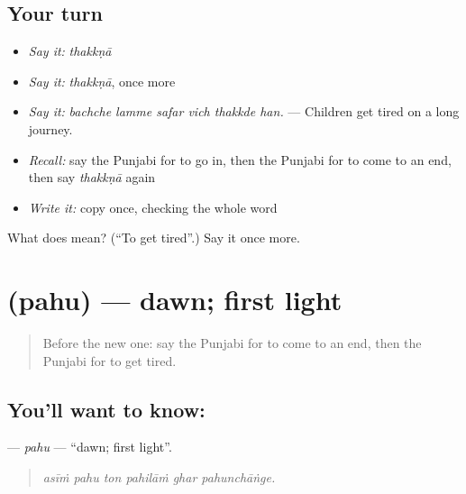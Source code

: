 \subsection*{Your turn}
\begin{itemize}
\raggedright
  \item \emph{Say it:} \emph{thakkṇā}
  \item \emph{Say it:} \emph{thakkṇā}, once more
  \item \emph{Say it:} \emph{bachche lamme safar vich thakkde han.} — Children get tired on a long journey.
  \item \emph{Recall:} say the Punjabi for to go in, then the Punjabi for to come to an end, then say \emph{thakkṇā} again
  \item \emph{Write it:} copy \textbf{} once, checking the whole word
\end{itemize}

\begin{tcolorbox}[breakable,colback=teal!4,colframe=teal!35!black,title={Before you move on}]
What does  mean? (\textquotedblleft{}To get tired\textquotedblright{}.) Say it once more.
\end{tcolorbox}
\section[\texorpdfstring{\pa{ਪਹੁ} (pahu)}{ਪਹੁ (pahu)}]{ (pahu) — dawn; first light}

\label{lesson:PA-C285-pahu}



\begin{quote}
Before the new one: say the Punjabi for to come to an end, then the Punjabi for to get tired.
\end{quote}

\subsection*{You'll want to know: }
\textbf{} — \emph{pahu} — \textquotedblleft{}dawn; first light\textquotedblright{}.

\begin{quote}
     
\end{quote}

\begin{quote}
\emph{asīṁ pahu ton pahilāṁ ghar pahunchāṅge.}
\end{quote}

